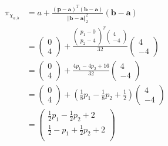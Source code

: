 \begin{align*}
  \pi_{\chi_{a,b}} &= a + \frac{(\mathbf{p} - \mathbf{a})^T (\mathbf{b} - \mathbf{a})}{\Vert \mathbf{b} - \mathbf{a} \Vert^2_2} (\mathbf{b} - \mathbf{a})  \\
  &= \left(\begin{smallmatrix}0 \\ 4 \end{smallmatrix}\right) + \frac{\left(\begin{smallmatrix}p_1 - 0 \\ p_2 - 4 \end{smallmatrix}\right)^T \left(\begin{smallmatrix}4 \\ -4 \end{smallmatrix}\right)}{32} \left(\begin{smallmatrix}4 \\ -4 \end{smallmatrix}\right) \\
  &= \left(\begin{smallmatrix}0 \\ 4 \end{smallmatrix}\right) + \frac{4p_1 - 4p_2 + 16}{32} \left(\begin{smallmatrix}4 \\ -4 \end{smallmatrix}\right) \\
  &= \left(\begin{smallmatrix}0 \\ 4 \end{smallmatrix}\right) + \left(\frac{1}{8} p_1 - \frac{1}{8} p_2 + \frac{1}{2} \right) \left(\begin{smallmatrix}4 \\ -4 \end{smallmatrix}\right) \\
  &=\begin{pmatrix}
      \frac{1}{2} p_1 - \frac{1}{2} p_2 + 2 \\
      \frac{1}{2} - p_1 + \frac{1}{2} p_2 + 2 \\
    \end{pmatrix}
\end{align*}
%

%
%

%
%




